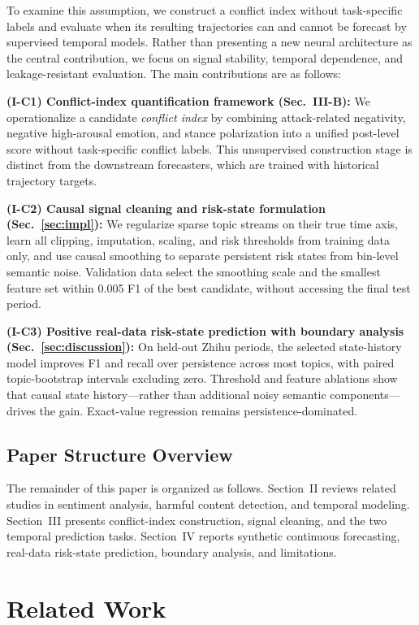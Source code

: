 \documentclass[journal]{IEEEtran}
\begin{document}
To examine this assumption, we construct a conflict index without task-specific labels and evaluate when its resulting trajectories can and cannot be forecast by supervised temporal models. Rather than presenting a new neural architecture as the central contribution, we focus on signal stability, temporal dependence, and leakage-resistant evaluation. The main contributions are as follows:

\noindent\textbf{(I-C1) Conflict-index quantification framework (Sec.~III-B):}
We operationalize a candidate \emph{conflict index} by combining attack-related negativity, negative high-arousal emotion, and stance polarization into a unified post-level score without task-specific conflict labels. This unsupervised construction stage is distinct from the downstream forecasters, which are trained with historical trajectory targets.

\noindent\textbf{(I-C2) Causal signal cleaning and risk-state formulation (Sec.~\ref{sec:impl}):}
We regularize sparse topic streams on their true time axis, learn all clipping, imputation, scaling, and risk thresholds from training data only, and use causal smoothing to separate persistent risk states from bin-level semantic noise. Validation data select the smoothing scale and the smallest feature set within 0.005 F1 of the best candidate, without accessing the final test period.

\noindent\textbf{(I-C3) Positive real-data risk-state prediction with boundary analysis (Sec.~\ref{sec:discussion}):}
On held-out Zhihu periods, the selected state-history model improves F1 and recall over persistence across most topics, with paired topic-bootstrap intervals excluding zero. Threshold and feature ablations show that causal state history---rather than additional noisy semantic components---drives the gain. Exact-value regression remains persistence-dominated.

\subsection{Paper Structure Overview}
The remainder of this paper is organized as follows. Section~II reviews related studies in sentiment analysis, harmful content detection, and temporal modeling. Section~III presents conflict-index construction, signal cleaning, and the two temporal prediction tasks. Section~IV reports synthetic continuous forecasting, real-data risk-state prediction, boundary analysis, and limitations.

\section{Related Work}
\end{document}
